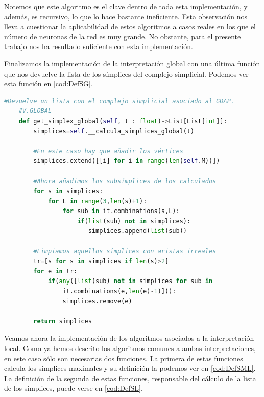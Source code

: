 \documentclass[12pt, a4paper, twoside]{book}
\numberwithin{equation}{section}
\theoremstyle{definition}
\theoremstyle{remark}
\theoremstyle{plain}
\begin{document}
	Notemos que este algoritmo es el clave dentro de toda esta 
	implementación, y además, es recursivo, lo que lo hace bastante 
	ineficiente. Esta observación nos lleva a 
	cuestionar la aplicabilidad de estos algoritmos a casos reales en los 
	que el número de neuronas de la red es muy grande. No obstante, para 
	el presente trabajo nos ha resultado suficiente con esta 
	implementación.

	Finalizamos la implementación de la interpretación global con una 
	última función que nos devuelve la lista de los símplices del complejo
	simplicial. Podemos ver esta función en \autoref{cod:DefSG}.

	\begin{lstlisting}[language=Python, float=htbp, caption= Función para 
	el cálculo de todos los símplices (global)., label=cod:DefSG]
	#Devuelve un lista con el complejo simplicial asociado al GDAP. 
	#V.GLOBAL
	def get_simplex_global(self, t : float)->List[List[int]]:
        simplices=self.__calcula_simplices_global(t)
        
        #En este caso hay que añadir los vértices
        simplices.extend([[i] for i in range(len(self.M))])
        
        #Ahora añadimos los subsímplices de los calculados
        for s in simplices:
            for L in range(3,len(s)+1):
                for sub in it.combinations(s,L):
                    if(list(sub) not in simplices):
                       simplices.append(list(sub))
        
        #Limpiamos aquellos símplices con aristas irreales
        tr=[s for s in simplices if len(s)>2]
        for e in tr:
            if(any([list(sub) not in simplices for sub in 
                it.combinations(e,len(e)-1)])):
                simplices.remove(e)

        return simplices
	\end{lstlisting}

	Veamos ahora la implementación de los algoritmos asociados a la 
	interpretación local. Como ya hemos descrito los algoritmos comunes a 
	ambas interpretaciones, en este caso sólo son necesarias dos 
	funciones. La primera de estas funciones calcula los símplices 
	maximales y su definición la podemos ver en \autoref{cod:DefSML}. La 
	definición de la segunda de estas funciones, responsable del cálculo 
	de la lista de los símplices, puede verse en  \autoref{cod:DefSL}.
\end{document}
